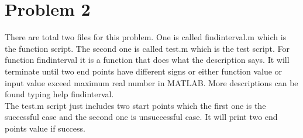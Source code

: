\documentclass{article}
\begin{document}
\section*{Problem 2}

There are total two files for this problem.
One is called findinterval.m which is the function script.
The second one is called test.m which is the test script.
For function findinterval it is a function that does what the description says.
It will terminate until two end points have different signs or either function value or input value exceed maximum real number in MATLAB.
More descriptions can be found typing help findinterval.
\\
The test.m script just includes two start points which the first one is the successful case and the second one is unsuccessful case.
It will print two end points value if success.
\end{document}
